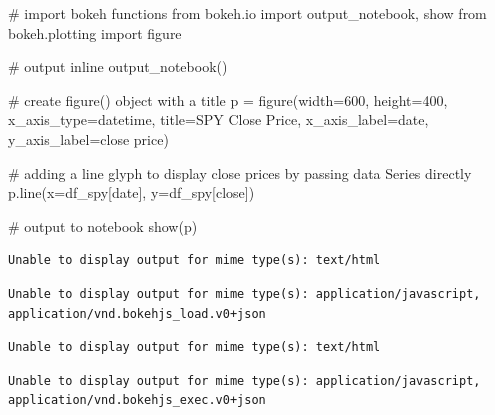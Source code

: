 \documentclass[
  letterpaper,
  DIV=11,
  numbers=noendperiod]{scrreprt}
\newenvironment{Shaded}{\begin{snugshade}}{\end{snugshade}}
\newcommand{\CommentTok}[1]{\textcolor[rgb]{0.37,0.37,0.37}{#1}}
\newcommand{\DecValTok}[1]{\textcolor[rgb]{0.68,0.00,0.00}{#1}}
\newcommand{\ImportTok}[1]{\textcolor[rgb]{0.00,0.46,0.62}{#1}}
\newcommand{\NormalTok}[1]{\textcolor[rgb]{0.00,0.23,0.31}{#1}}
\newcommand{\OperatorTok}[1]{\textcolor[rgb]{0.37,0.37,0.37}{#1}}
\newcommand{\StringTok}[1]{\textcolor[rgb]{0.13,0.47,0.30}{#1}}
\begin{document}
\begin{Shaded}
\begin{Highlighting}[]
\CommentTok{\# import bokeh functions}
\ImportTok{from}\NormalTok{ bokeh.io }\ImportTok{import}\NormalTok{ output\_notebook, show}
\ImportTok{from}\NormalTok{ bokeh.plotting }\ImportTok{import}\NormalTok{ figure}

\CommentTok{\# output inline}
\NormalTok{output\_notebook()}

\CommentTok{\# create figure() object with a title}
\NormalTok{p }\OperatorTok{=}\NormalTok{ figure(width}\OperatorTok{=}\DecValTok{600}\NormalTok{, height}\OperatorTok{=}\DecValTok{400}\NormalTok{, x\_axis\_type}\OperatorTok{=}\StringTok{\textquotesingle{}datetime\textquotesingle{}}\NormalTok{, title}\OperatorTok{=}\StringTok{\textquotesingle{}SPY Close Price\textquotesingle{}}\NormalTok{,}
\NormalTok{           x\_axis\_label}\OperatorTok{=}\StringTok{\textquotesingle{}date\textquotesingle{}}\NormalTok{, y\_axis\_label}\OperatorTok{=}\StringTok{\textquotesingle{}close price\textquotesingle{}}\NormalTok{)}

\CommentTok{\# adding a line glyph to display close prices by passing data Series directly}
\NormalTok{p.line(x}\OperatorTok{=}\NormalTok{df\_spy[}\StringTok{\textquotesingle{}date\textquotesingle{}}\NormalTok{], y}\OperatorTok{=}\NormalTok{df\_spy[}\StringTok{\textquotesingle{}close\textquotesingle{}}\NormalTok{])}

\CommentTok{\# output to notebook}
\NormalTok{show(p)}
\end{Highlighting}
\end{Shaded}

\begin{verbatim}
Unable to display output for mime type(s): text/html
\end{verbatim}

\begin{verbatim}
Unable to display output for mime type(s): application/javascript, application/vnd.bokehjs_load.v0+json
\end{verbatim}

\begin{verbatim}
Unable to display output for mime type(s): text/html
\end{verbatim}

\begin{verbatim}
Unable to display output for mime type(s): application/javascript, application/vnd.bokehjs_exec.v0+json
\end{verbatim}
\end{document}
